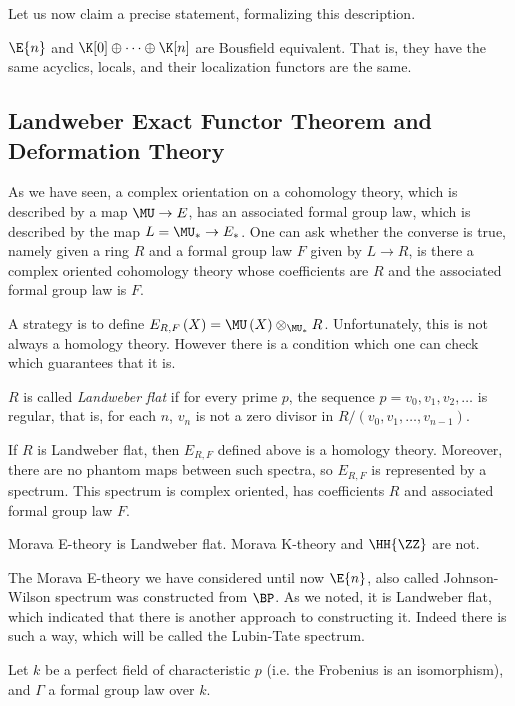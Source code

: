 Let us now claim a precise statement, formalizing this description.

\begin{theorem}
	$\E{n}$ and $\K[0] \oplus \cdots \oplus \K[n]$ are Bousfield equivalent.
	That is, they have the same acyclics, locals, and their localization functors are the same.
\end{theorem}




\subsection{Landweber Exact Functor Theorem and Deformation Theory}

As we have seen, a complex orientation on a cohomology theory, which is described by a map $\MU \to E$, has an associated formal group law, which is described by the map $L = \MU_* \to E_*$.
One can ask whether the converse is true, namely given a ring $R$ and a formal group law $F$ given by $L \to R$, is there a complex oriented cohomology theory whose coefficients are $R$ and the associated formal group law is $F$.

A strategy is to define $E_{R,F}\left(X\right) = \MU\left(X\right) \otimes_{\MU_*} R$.
Unfortunately, this is not always a homology theory.
However there is a condition which one can check which guarantees that it is.

\begin{definition}
	$R$ is called \emph{Landweber flat} if for every prime $p$, the sequence $p = v_0, v_1, v_2, \dotsc$ is regular,
	that is, for each $n$, $v_n$ is not a zero divisor in $R/\left(v_0, v_1, \dotsc, v_{n-1}\right)$.
\end{definition}

\begin{theorem}
	If $R$ is Landweber flat, then $E_{R,F}$ defined above is a homology theory.
	Moreover, there are no phantom maps between such spectra, so $E_{R,F}$ is represented by a spectrum.
	This spectrum is complex oriented, has coefficients $R$ and associated formal group law $F$.
\end{theorem}

\begin{example}
	Morava E-theory is Landweber flat.
	Morava K-theory and $\HH{\ZZ}$ are not.
\end{example}

The Morava E-theory we have considered until now $\E{n}$, also called Johnson-Wilson spectrum was constructed from $\BP$.
As we noted, it is Landweber flat, which indicated that there is another approach to constructing it.
Indeed there is such a way, which will be called the Lubin-Tate spectrum.

Let $k$ be a perfect field of characteristic $p$ (i.e. the Frobenius is an isomorphism), and $\Gamma$ a formal group law over $k$.